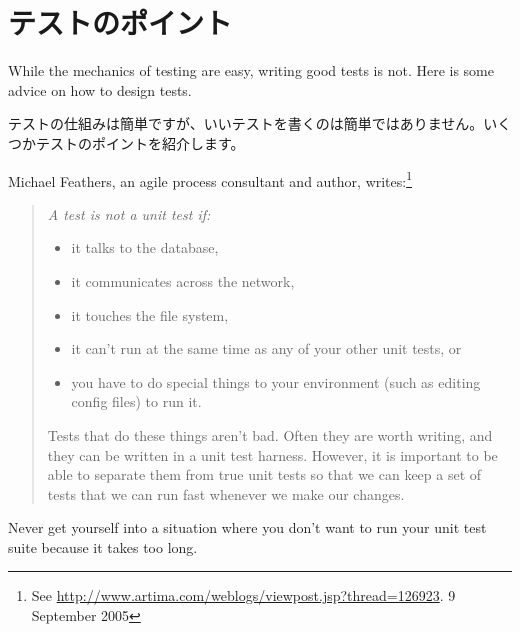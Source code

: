 \documentclass[a4paper,10pt,twoside]{book}
\begin{document}
{{\section{テストのポイント}

While the mechanics of testing are easy, writing good tests is not.
Here is some advice on how to design tests.

テストの仕組みは簡単ですが、いいテストを書くのは簡単ではありません。いくつかテストのポイントを紹介します。

\begin{description}


\item[Feathers' Rules for Unit tests.]
  Michael Feathers, an  agile process consultant and author, writes:\footnote{See \url{http://www.artima.com/weblogs/viewpost.jsp?thread=126923}. 9 September 2005} 
  \begin{quotation}
  \noindent
  {\it
  A test is not a unit test if:
  \begin{itemize}
	\item it talks to the database,
	\item it communicates across the network,
	\item it touches the file system,
	\item it can't run at the same time as any of your other unit tests, or
	\item you have to do special things to your environment (such as editing config files) to run it.
 \end{itemize}
Tests that do these things aren't bad. Often they are worth writing, and they can be written in a unit test harness. However, it is important to be able to separate them from true unit tests so that we can keep a set of tests that we can run fast whenever we make our changes.
 }
  \end{quotation}
Never get yourself into a situation where you don't want to run your unit test suite because it takes too long.   
 

\end{description}}}
\end{document}
